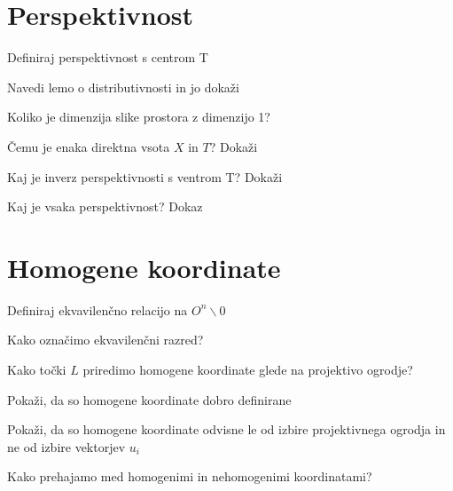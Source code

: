 \documentclass{article}
\begin{document}
    \section{Perspektivnost}
    \begin{enumerate}
        \item Definiraj perspektivnost s centrom T
        {\color{red}\item Navedi lemo o distributivnosti in jo dokaži}
        {\color{blue}\item Koliko je dimenzija slike prostora z dimenzijo 1?}
        \item Čemu je enaka direktna vsota $X$ in $T$? Dokaži
        \item Kaj je inverz perspektivnosti s ventrom T? Dokaži
        {\color{blue}\item Kaj je vsaka perspektivnost? Dokaz}
    \end{enumerate}

    \section{Homogene koordinate}
    \begin{enumerate}
        \item Definiraj ekvavilenčno relacijo na $O^n \backslash {0}$ 
        \item Kako označimo ekvavilenčni razred?
        {\color{red}\item Kako točki $L$ priredimo homogene koordinate glede na projektivo ogrodje?}
        \item Pokaži, da so homogene koordinate dobro definirane
        {\color{red}\item Pokaži, da so homogene koordinate odvisne le od izbire projektivnega ogrodja in ne od izbire vektorjev $u_i$}
        \item Kako prehajamo med homogenimi in nehomogenimi koordinatami?
    \end{enumerate}
\end{document}
